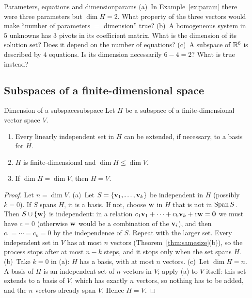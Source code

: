 \documentclass[11pt]{article}
\begin{document}
\begin{think}{Parameters, equations and dimension}{params}
(a)~In Example~\ref{ex:param} there were three parameters but $\dim H=2$. What property of the three vectors would make ``number of parameters $=$ dimension'' true? (b)~A homogeneous system in $5$ unknowns has $3$ pivots in its coefficient matrix. What is the dimension of its solution set? Does it depend on the number of equations? (c)~A subspace of $\mathbb{R}^6$ is described by $4$ equations. Is its dimension necessarily $6-4=2$? What is true instead?
\end{think}

\subsection*{Subspaces of a finite-dimensional space}

\begin{thm}{Dimension of a subspace}{subspace}
Let $H$ be a subspace of a finite-dimensional vector space $V$.
\begin{enumerate}[label=(\alph*),itemsep=1pt]
  \item Every linearly independent set in $H$ can be extended, if necessary, to a basis for $H$.
  \item $H$ is finite-dimensional and $\dim H\le\dim V$.
  \item If $\dim H=\dim V$, then $H=V$.
\end{enumerate}
\end{thm}

\begin{proof}
Let $n=\dim V$. (a)~Let $S=\{\mathbf{v}_1,\dots,\mathbf{v}_k\}$ be independent in $H$ (possibly $k=0$). If $S$ spans $H$, it is a basis. If not, choose $\mathbf{w}$ in $H$ that is not in $\operatorname{Span} S$. Then $S\cup\{\mathbf{w}\}$ is independent: in a relation $c_1\mathbf{v}_1+\cdots+c_k\mathbf{v}_k+c\mathbf{w}=\mathbf{0}$ we must have $c=0$ (otherwise $\mathbf{w}$ would be a combination of the $\mathbf{v}_i$), and then $c_1=\cdots=c_k=0$ by the independence of $S$. Repeat with the larger set. Every independent set in $V$ has at most $n$ vectors (Theorem~\ref{thm:samesize}(b)), so the process stops after at most $n-k$ steps, and it stops only when the set spans $H$. (b)~Take $k=0$ in (a): $H$ has a basis, with at most $n$ vectors. (c)~Let $\dim H=n$. A basis of $H$ is an independent set of $n$ vectors in $V$; apply (a) to $V$ itself: this set extends to a basis of $V$, which has exactly $n$ vectors, so nothing has to be added, and the $n$ vectors already span $V$. Hence $H=V$.
\end{proof}
\end{document}
